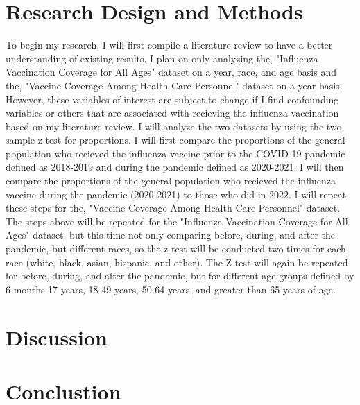 \documentclass[12pt]{article}
\begin{document}
\section{Research Design and Methods}
\label{sec:design}
To begin my research, I will first compile a literature review to have a better understanding of existing results. I plan on only analyzing the, 
"Influenza Vaccination Coverage for All Ages" dataset on a year, race, and age basis and the, "Vaccine Coverage Among Health Care Personnel" 
dataset on a year basis. However, these variables of interest are subject to change if I find confounding variables or others that
are associated with recieving the influenza vaccination based on my literature review. I will analyze the two datasets by using the two sample z 
test for proportions. I will first compare the proportions of the general population who recieved the influenza vaccine prior to the COVID-19 
pandemic defined as 2018-2019 and during the pandemic defined as 2020-2021. I will then compare the proportions of the general population who
recieved the influenza vaccine during the pandemic (2020-2021) to those who did in 2022. I will repeat these steps for the, "Vaccine Coverage Among 
Health Care Personnel" dataset. The steps above will be repeated for the "Influenza Vaccination Coverage for All Ages" dataset, but this time not only
comparing before, during, and after the pandemic, but different races, so the z test will be conducted two times for each race (white, black, asian,
hispanic, and other). The Z test will again be repeated for before, during, and after the pandemic, but for different age groups defined by 6 months-17 years, 
18-49 years, 50-64 years, and greater than 65 years of age.
\section{Discussion}
\label{sec:discussion}

\section{Conclustion}\
\label{sec:Conclusion}



\end{document}
